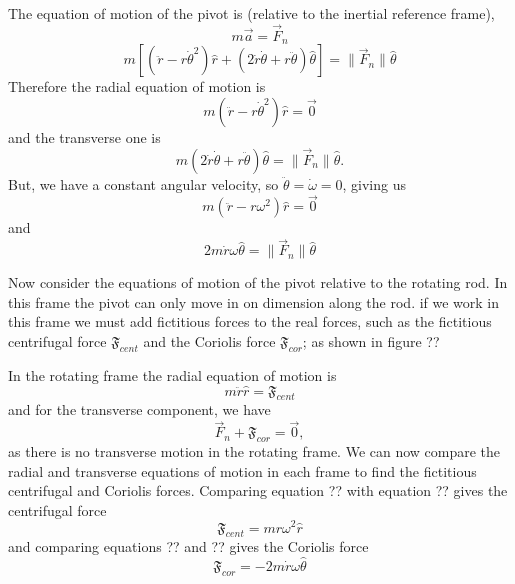 The equation of motion of the pivot is (relative to the inertial reference frame),
\begin{equation}
    m \vec{a} = \vec{F}_n
\end{equation}
\begin{equation}
    m \left[ \left(\ddot{r} - r \dot{\theta}^2 \right) \hat{r} + \left(2 \dot{r} \dot{\theta} + r \ddot{\theta}\right) \hat{\theta} \right] = \| \vec{F}_n \| \hat{\theta}
\end{equation}
Therefore the radial equation of motion is
\begin{equation}
    m \left(\ddot{r} - r \dot{\theta}^2 \right) \hat{r} = \vec{0}
\end{equation}
and the transverse one is
\begin{equation}
    m \left(2 \dot{r} \dot{\theta} + r \ddot{\theta} \right) \hat{\theta} = \| \vec{F}_n \| \hat{\theta}.
\end{equation}
But, we have a constant angular velocity, so $\ddot{\theta} = \dot{\omega} = 0$, giving us
\begin{equation}
    m \left(\ddot{r} - r \omega^2 \right) \hat{r} = \vec{0} 
\end{equation}
and
\begin{equation}
    2 m \dot{r} \omega \hat{\theta} = \| \vec{F}_n \| \hat{\theta}
\end{equation}

Now consider the equations of motion of the pivot relative to the rotating rod. In this frame the pivot can only move in on dimension along the rod. if we work in this frame we must add fictitious forces to the real forces, such as the fictitious centrifugal force $\mathfrak{F}_{cent}$ and the Coriolis force $\mathfrak{F}_{cor}$; as shown in figure ??

In the rotating frame the radial equation of motion is
\begin{equation}
    m \ddot{r} \hat{r} = \mathfrak{F}_{cent}
\end{equation}
and for the transverse component, we have
\begin{equation}
    \vec{F}_n + \mathfrak{F}_{cor} = \vec{0},
\end{equation}
as there is no transverse motion in the rotating frame. We can now compare the radial and transverse equations of motion in each frame to find the fictitious centrifugal and Coriolis forces. Comparing equation ?? with equation ?? gives the centrifugal force
\begin{equation}
    \mathfrak{F}_{cent} = m r \omega^2 \hat{r}
\end{equation}
and comparing equations ?? and ?? gives the Coriolis force
\begin{equation}
    \mathfrak{F}_{cor} = -2m\dot{r}\omega \hat{\theta}
\end{equation}


